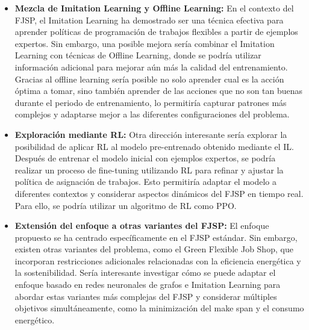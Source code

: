 \begin{itemize}
    \item \textbf{Mezcla de Imitation Learning y Offline Learning:} En 
    el contexto del FJSP, el Imitation Learning ha demostrado ser una 
    técnica efectiva para aprender políticas de programación de trabajos 
    flexibles a partir de ejemplos expertos. Sin embargo, una posible mejora 
    sería combinar el Imitation Learning con técnicas de Offline Learning, 
    donde se podría utilizar información adicional para mejorar aún más la 
    calidad del entrenamiento. Gracias al offline learning sería posible no 
    solo aprender cual es la acción óptima a tomar, sino también aprender 
    de las acciones que no son tan buenas durante el periodo de entrenamiento, 
    lo permitiría capturar patrones más complejos y adaptarse mejor a las 
    diferentes configuraciones del problema.
   \item \textbf{Exploración mediante RL:} Otra dirección interesante sería explorar 
   la posibilidad de aplicar RL al modelo pre-entrenado obtenido mediante 
   el IL. Después de entrenar el modelo inicial con ejemplos expertos, 
   se podría realizar un proceso de fine-tuning utilizando RL para refinar 
   y ajustar la política de asignación de trabajos. Esto permitiría adaptar 
   el modelo a diferentes contextos y considerar aspectos dinámicos del 
   FJSP en tiempo real. Para ello, se podría utilizar un algoritmo de
   RL como PPO.
   \item \textbf{Extensión del enfoque a otras variantes del FJSP:} El 
   enfoque propuesto se ha centrado específicamente en el FJSP estándar. 
   Sin embargo, existen otras variantes del problema, como el Green Flexible 
   Job Shop, que incorporan restricciones adicionales relacionadas con la 
   eficiencia energética y la sostenibilidad. Sería interesante investigar 
   cómo se puede adaptar el enfoque basado en redes neuronales de grafos e 
   Imitation Learning para abordar estas variantes más complejas del FJSP y 
   considerar múltiples objetivos simultáneamente, como la minimización del 
   make span y el consumo energético.
\end{itemize}